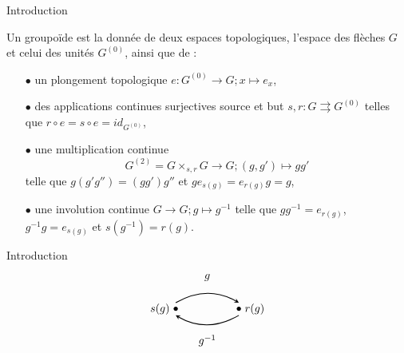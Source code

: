 \begin{frame}{Introduction}

\vspace{0.3 cm}
\begin{definitionfr}[Groupoïde]
Un groupoïde est la donnée de deux espaces topologiques, l'espace des flèches $G$ et celui des unités $G^{(0)}$, ainsi que de :
\begin{itemize}
\item[$\bullet$] un plongement topologique $e: G^{(0)} \rightarrow G; x\mapsto e_x$, 
\item[$\bullet$] des applications continues surjectives source et but $s,r : G\rightrightarrows G^{(0)}$ telles que $r\circ e =s\circ e = id_{G^{(0)}}$,
\item[$\bullet$] une multiplication continue \[G^{(2)}=G\times_{s,r} G\rightarrow G; (g,g') \mapsto gg'\] 
telle que $g(g'g'') = (gg')g''$ et $ge_{s(g)} = e_{r(g)}g= g$,
\item[$\bullet$] une involution continue $G\rightarrow G ; g\mapsto g^{-1}$ telle que $gg^{-1} = e_{r(g)}$, $g^{-1}g = e_{s(g)}$ et $s(g^{-1})=r(g)$.	
\end{itemize}
\end{definitionfr}
\end{frame}

\begin{frame}{Introduction}
\[\begin{tikzpicture}
\draw  (0,1) node {$g$};
\draw  (0,-1) node {$g^{-1}$};
\draw [>=stealth, ->, thick] (-1,0.2) to[bend left] (1,0.2);
\draw [>=stealth, ->,thick] (1,-0.2) to[bend left] (-1,-0.2);
\draw  (-1,0) node {$\bullet$};
\draw  (-1.5,0) node {$s(g)$};
\draw  (1,0) node {$\bullet$};
\draw  (1.5,0) node {$r(g)$};
\end{tikzpicture}\]
\end{frame}

